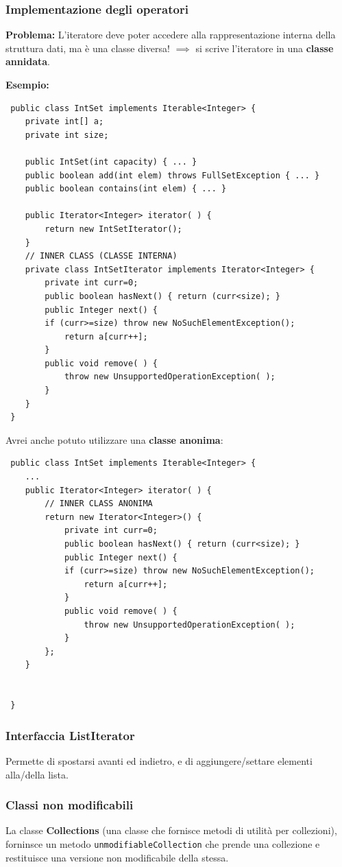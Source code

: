\documentclass[a4paper,10pt]{article}
\begin{document}
\subsubsection{Implementazione degli operatori}
\textbf{Problema:} L'iteratore deve poter accedere alla rappresentazione interna della struttura dati, ma è una classe diversa! $\implies$ si scrive l'iteratore in una \textbf{classe annidata}.\smallskip

\textbf{Esempio:}
\begin{lstlisting}
 public class IntSet implements Iterable<Integer> {
    private int[] a;
    private int size;
    
    public IntSet(int capacity) { ... }
    public boolean add(int elem) throws FullSetException { ... }
    public boolean contains(int elem) { ... }
    
    public Iterator<Integer> iterator( ) {
        return new IntSetIterator();
    }
    // INNER CLASS (CLASSE INTERNA)
    private class IntSetIterator implements Iterator<Integer> {
        private int curr=0;
        public boolean hasNext() { return (curr<size); }
        public Integer next() {
        if (curr>=size) throw new NoSuchElementException();
            return a[curr++];
        }
        public void remove( ) {
            throw new UnsupportedOperationException( );
        }
    }
 }
\end{lstlisting}

Avrei anche potuto utilizzare una \textbf{classe anonima}:
\begin{lstlisting}
 public class IntSet implements Iterable<Integer> {
    ...
    public Iterator<Integer> iterator( ) {
        // INNER CLASS ANONIMA
        return new Iterator<Integer>() {
            private int curr=0;
            public boolean hasNext() { return (curr<size); }
            public Integer next() {
            if (curr>=size) throw new NoSuchElementException();
                return a[curr++];
            }
            public void remove( ) {
                throw new UnsupportedOperationException( );
            }
        };
    }
    
    
 }
\end{lstlisting}

\subsubsection{Interfaccia ListIterator}
Permette di spostarsi avanti ed indietro, e di aggiungere/settare elementi alla/della lista.

\subsubsection{Classi non modificabili}

La classe \textbf{Collections} (una classe che fornisce metodi di utilità per collezioni), forninsce un metodo \texttt{unmodifiableCollection} che prende una collezione e restituisce una versione non modificabile della stessa.
\end{document}
